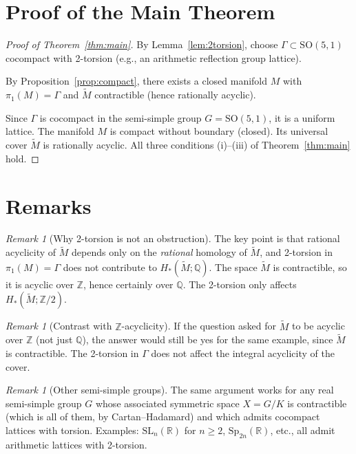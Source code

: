 \documentclass[12pt]{article}
\theoremstyle{definition}
\theoremstyle{remark}
\newtheorem{remark}[theorem]{Remark}
\begin{document}
\section{Proof of the Main Theorem}

\begin{proof}[Proof of Theorem~\ref{thm:main}]
By Lemma~\ref{lem:2torsion}, choose $\Gamma\subset\mathrm{SO}(5,1)$
cocompact with 2-torsion (e.g., an arithmetic reflection group lattice).

By Proposition~\ref{prop:compact}, there exists a closed manifold $M$ with
$\pi_1(M) = \Gamma$ and $\tilde{M}$ contractible (hence rationally acyclic).

Since $\Gamma$ is cocompact in the semi-simple group $G = \mathrm{SO}(5,1)$,
it is a uniform lattice.  The manifold $M$ is compact without boundary
(closed).  Its universal cover $\tilde{M}$ is rationally acyclic.
All three conditions (i)--(iii) of Theorem~\ref{thm:main} hold.
\end{proof}

\section{Remarks}

\begin{remark}[Why 2-torsion is not an obstruction]
The key point is that rational acyclicity of $\tilde{M}$ depends only on
the \emph{rational} homology of $\tilde{M}$, and 2-torsion in $\pi_1(M)=\Gamma$
does not contribute to $H_*(\tilde{M};\mathbb{Q})$.  The space $\tilde{M}$
is contractible, so it is acyclic over $\mathbb{Z}$, hence certainly over
$\mathbb{Q}$.  The 2-torsion only affects $H_*(\tilde{M};\mathbb{Z}/2)$.
\end{remark}

\begin{remark}[Contrast with $\mathbb{Z}$-acyclicity]
If the question asked for $\tilde{M}$ to be acyclic over $\mathbb{Z}$ (not
just $\mathbb{Q}$), the answer would still be yes for the same example,
since $\tilde{M}$ is contractible.  The 2-torsion in $\Gamma$ does not
affect the integral acyclicity of the cover.
\end{remark}

\begin{remark}[Other semi-simple groups]
The same argument works for any real semi-simple group $G$ whose associated
symmetric space $X = G/K$ is contractible (which is all of them, by
Cartan--Hadamard) and which admits cocompact lattices with torsion.
Examples: $\mathrm{SL}_n(\mathbb{R})$ for $n\geq 2$, $\mathrm{Sp}_{2n}(\mathbb{R})$,
etc., all admit arithmetic lattices with 2-torsion.
\end{remark}
\end{document}
